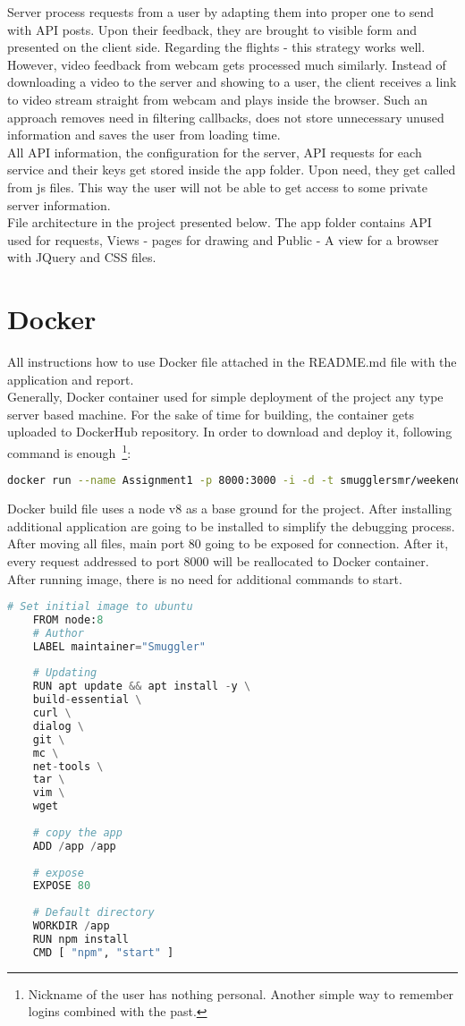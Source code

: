\documentclass[12pt]{article}
\numberwithin{equation}{section} %
\numberwithin{figure}{section} %
\numberwithin{table}{section} %
\begin{document}
	Server process requests from a user by adapting them into proper one to send with API posts. Upon their feedback, they are brought to visible form and presented on the client side. Regarding the flights - this strategy works well. However, video feedback from webcam gets processed much similarly. Instead of downloading a video to the server and showing to a user, the client receives a link to video stream straight from webcam and plays inside the browser. Such an approach removes need in filtering callbacks, does not store unnecessary unused information and saves the user from loading time. \\
	All API information, the configuration for the server, API requests for each service and their keys get stored inside the app folder. Upon need, they get called from js files. This way the user will not be able to get access to some private server information. \\
	File architecture in the project presented below. The app folder contains API used for requests, Views - pages for drawing and Public - A view for a browser with JQuery and CSS files. \\
	
\section{Docker}
	All instructions how to use Docker file attached in the README.md file with the application and report.\\
	Generally, Docker container used for simple deployment of the project any type server based machine. For the sake of time for building, the container gets uploaded to DockerHub repository. In order to download and deploy it, following command is enough~\footnote{Nickname of the user has nothing personal. Another simple way to remember logins combined with the past.}: \\
	\begin{lstlisting}[language=bash]
	docker run --name Assignment1 -p 8000:3000 -i -d -t smugglersmr/weekends-pl
	\end{lstlisting}
	Docker build file uses a node v8 as a base ground for the project. After installing additional application are going to be installed to simplify the debugging process. After moving all files, main port 80 going to be exposed for connection. After it, every request addressed to port 8000 will be reallocated to Docker container. After running image, there is no need for additional commands to start.\\
	\begin{lstlisting}[language=Python]
	# Set initial image to ubuntu
	FROM node:8
	# Author
	LABEL maintainer="Smuggler"
	
	# Updating
	RUN apt update && apt install -y \
	build-essential \
	curl \
	dialog \
	git \
	mc \
	net-tools \
	tar \
	vim \
	wget
	
	# copy the app
	ADD /app /app
	
	# expose
	EXPOSE 80
	
	# Default directory
	WORKDIR /app
	RUN npm install
	CMD [ "npm", "start" ]	
	\end{lstlisting}
\end{document}
